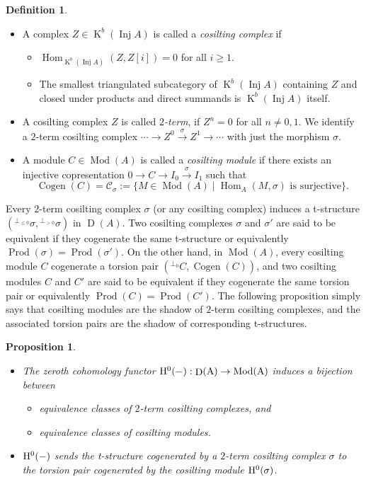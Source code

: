 \documentclass[12pt]{amsart}
\numberwithin{equation}{section}
\newtheorem{proposition}[lemma]{Proposition}
\theoremstyle{definition}
\newtheorem{definition}[lemma]{Definition}
\DeclareMathOperator{\Mod}{Mod}
\DeclareMathOperator{\Hom}{Hom}
\DeclareMathOperator{\K}{K}
\DeclareMathOperator{\Cogen}{Cogen}
\DeclareMathOperator{\Inj}{Inj}
\DeclareMathOperator{\D}{D}
\DeclareMathOperator{\Prod}{Prod}
\newtheorem*{theorem 0*}{Theorem}
\newtheorem*{theorem a*}{Theorem A}
\newtheorem*{theorem b*}{Theorem B}
\numberwithin{diagram}{section}
\begin{document}
\begin{definition}\label{2.6}
\begin{itemize}
\item[(1)]
A complex $Z\in \K^b(\Inj A)$ is called a {\it cosilting complex} if
\begin{itemize}
\item[(a)]
$\Hom_{\K^b(\Inj A)}(Z,Z[i])=0$ for all $i\geq 1$.
\item[(b)]
The smallest triangulated subcategory of $\K^b(\Inj A)$ containing $Z$ and closed under products and direct summands is $\K^b(\Inj A)$ itself.
\end{itemize}
\item[(2)]
A cosilting complex $Z$ is called {\it $2$-term}, if $Z^n=0$ for all $n\neq 0,1$. We identify a $2$-term cosilting complex $\cdots\rightarrow Z^0\overset{\sigma}{\rightarrow}Z^1\rightarrow\cdots$ with just the morphism $\sigma$.
\item[(3)]
A module $C\in\Mod(A)$ is called a {\it cosilting module} if there exists an injective copresentation $0\rightarrow C\rightarrow I_0\overset{\sigma}{\rightarrow}I_1$ such that
\[\Cogen(C)=\mathcal{C}_{\sigma}:=\{M\in\Mod(A) \mid \Hom_A(M,\sigma) \text{ is surjective}\}.\]
\end{itemize}
\end{definition}
Every $2$-term cosilting complex $\sigma$ (or any cosilting complex) induces a t-structure $({}^{\perp_{\leq 0}}\sigma,{}^{\perp_{> 0}}\sigma)$ in $\D(A)$.
Two cosilting complexes $\sigma$ and $\sigma'$ are said to be equivalent if they cogenerate the same t-structure or equivalently $\Prod(\sigma)=\Prod(\sigma')$.
On the other hand, in $\Mod(A)$, every cosilting module $C$ cogenerate a torsion pair $({}^{\bot_0}C,\Cogen(C))$, and two cosilting modules $C$ and $C'$ are said to be equivalent if they cogenerate the same torsion pair or equivalently $\Prod(C)=\Prod(C')$. The following proposition simply says that cosilting modules are the shadow of $2$-term cosilting complexes, and the associated torsion pairs are the shadow of corresponding t-structures.

\begin{proposition}\label{2.7}
\begin{itemize}
\item[(1)]
The zeroth cohomology functor $\rm H^0(-):\D(A)\rightarrow \Mod(A)$ induces a bijection between
\begin{itemize}
\item[(a)]
equivalence classes of $2$-term cosilting complexes, and
\item[(b)] 
equivalence classes of cosilting modules.
\end{itemize}
\item[(2)]
$\rm H^0(-)$ sends the t-structure cogenerated by a $2$-term cosilting complex $\sigma$ to the torsion pair cogenerated by the cosilting module $\rm H^0(\sigma)$.
\end{itemize}
\end{proposition}
	
\end{document}

